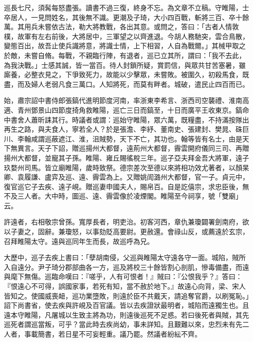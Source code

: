 \begin{pinyinscope}
 巡長七尺，須髯每怒盡張。讀書不過三復，終身不忘。為文章不立稿。守睢陽，士卒居人，一見問姓名，其後無不識。更潮及子琦，大小四百戰，斬將三百、卒十餘萬。其用兵未嘗依古法，勒大將教戰，各出其意。或問之，答曰：「古者人情敦樸，故軍有左右前後，大將居中，三軍望之以齊進退。今胡人務馳突，雲合鳥散，變態百出，故吾止使兵識將意，將識士情，上下相習，人自為戰爾。」其械甲取之於敵，未嘗自脩。每戰，不親臨行陣，有退者，巡已立其所，謂曰：「我不去此，為我決戰。」士感其誠，皆一當百。待人封鎖所疑，賞罰信，與眾共甘苦塞暑，雖廝養，必整衣見之，下爭致死力，故能以少擊眾，未嘗敗。被圍久，初殺馬食，既盡，而及婦人老弱凡食三萬口。人知將死，而莫有畔者。城破，遣民止四百而已。



 始，肅宗詔中書侍郎張鎬代進明節度河南，率浙東李希言、浙西司空襲禮、淮南高適、青州鄧景山四節度掎角救睢陽，巡亡三日而鎬至，十日而廣平王收東京。鎬命中書舍人蕭昕誄其行。時議者或謂：巡始守睢陽，眾六萬，既糧盡，不持滿按隊出再生之路，與夫食人，寧若全人？於是張澹、李紓、董南史、張建封、樊晁、硃巨川、李翰咸謂巡蔽遮江、淮，沮賊勢，天下不亡，其功也。翰等皆有名士，由是天下無異言。天子下詔，贈巡揚州大都督，遠荊州大都督，霽雲開府儀同三司、再贈揚州大都督，並寵其子孫。睢陽、雍丘賜徭稅三年。巡子亞夫拜金吾大將軍，遠子玖婺州司馬。皆立廟睢陽，歲時致祭。德宗差次至德以來將相功效尤著者，以顏杲卿、袁履謙、盧弈及巡、遠、霽雲為上。又贈姚訚潞州大都督，官一子。貞元中，復官巡它子去疾、遠子峴。贈巡妻申國夫人，賜帛百。自是訖僖宗，求忠臣後，無不及三人者。大中時，圖巡、遠、霽雲像於凌煙閣。睢陽至今祠享，號「雙廟」云。



 許遠者，右相敬宗曾孫。寬厚長者，明吏治。初客河西，章仇兼瓊闢署劍南府，欲以子妻之，固辭。兼瓊怒，以事劾貶高要尉。更赦還。會祿山反，或薦遠於玄宗，召拜睢陽太守。遠與巡同年生而長，故巡呼為兄。



 大歷中，巡子去疾上書曰：「孽胡南侵，父巡與睢陽太守遠各守一面。城陷，賊所入自遠分。尹子琦分郡部曲各一方，巡及將校三十餘皆割心剖肌，慘毒備盡，而遠與麾下無傷。巡臨命嘆曰：『嗟乎，人有可恨者！』賊曰：『公恨我乎？』答曰：『恨遠心不可得，誤國家事，若死有知，當不赦於地下。』故遠心向背，梁、宋人皆知之。使國威喪衄，巡功業墮敗，則遠於臣不共戴天，請追奪官爵，以刷冤恥。」詔下尚書省，使去疾與許峴及百官議。皆以去疾證狀最明者，城陷而遠獨生也。且遠本守睢陽，凡屠城以生致主將為功，則遠後巡死不足惑。若曰後死者與賊，其先巡死者謂巡當叛，可乎？當此時去疾尚幼，事未詳知。且艱難以來，忠烈未有先二人者，事載簡書，若日星不可妄輕重。議乃罷。然議者紛紜不齊。




\end{pinyinscope}
